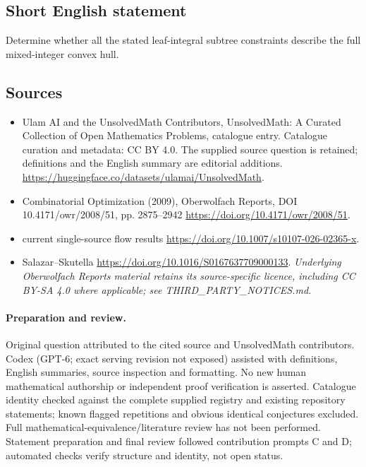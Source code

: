 \documentclass[11pt]{article}
\begin{document}
\subsection{Short English statement}
Determine whether all the stated leaf-integral subtree constraints describe the full mixed-integer convex hull.
\subsection{Sources}
\begin{itemize}
\item[\hypertarget{source:statement:1}{S1}] Ulam AI and the UnsolvedMath Contributors, UnsolvedMath: A Curated Collection of Open Mathematics Problems, catalogue entry. Catalogue curation and metadata: CC BY 4.0. The supplied source question is retained; definitions and the English summary are editorial additions.
\url{https://huggingface.co/datasets/ulamai/UnsolvedMath}.
\item[\hypertarget{source:statement:2}{S2}] Combinatorial Optimization (2009), Oberwolfach Reports, DOI 10.4171/owr/2008/51, pp. 2875--2942
\url{https://doi.org/10.4171/owr/2008/51}.
\item[\hypertarget{source:statement:3}{S3}] current single-source flow results
\url{https://doi.org/10.1007/s10107-026-02365-x}.
\item[\hypertarget{source:statement:4}{S4}] Salazar--Skutella
\url{https://doi.org/10.1016/S0167637709000133}.
\textit{Underlying Oberwolfach Reports material retains its source-specific licence, including CC BY-SA 4.0 where applicable; see THIRD\_PARTY\_NOTICES.md.}
\end{itemize}
\paragraph{Preparation and review.}
Original question attributed to the cited source and UnsolvedMath contributors. Codex (GPT-6; exact serving revision not exposed) assisted with definitions, English summaries, source inspection and formatting. No new human mathematical authorship or independent proof verification is asserted. Catalogue identity checked against the complete supplied registry and existing repository statements; known flagged repetitions and obvious identical conjectures excluded. Full mathematical-equivalence/literature review has not been performed. Statement preparation and final review followed contribution prompts C and D; automated checks verify structure and identity, not open status.
\label{end:statement}
\end{document}
